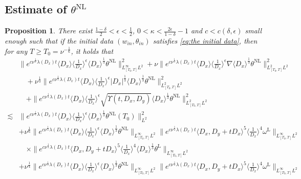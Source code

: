 \documentclass[reqno, 12pt]{amsart} %
\theoremstyle{plain} %
\newtheorem{Prop}[Thm]{Proposition}
\theoremstyle{definition}
\theoremstyle{remark}
\numberwithin{equation}{section} %
\begin{document}
	\subsection{Estimate of $\theta^{\mathrm{NL}}$}
	\begin{Prop} \label{lem:est of thetanl}
		There exist $\frac{1-\delta}{2}<\epsilon<\frac{1}{2}$, $0<\kappa<\frac{2\epsilon}{1-\delta}-1$ and $c<c(\delta,\epsilon)$ small enough such that if the initial data $(w_{in}, \theta_{in})$ satisfies \eqref{eq:the initial data}, then for any $  T \geq T_{0} = \nu^{-\frac{1}{6}} $, it holds that
		\footnotesize{\begin{align*} 
				& \| e^{c \nu^{\frac{1}{3}} \lambda\left(D_x\right) t}\langle D_x\rangle\langle\frac{1}{D_x}\rangle^\epsilon \langle D_x \rangle^\frac13  \theta^{\mathrm{NL}}\|_{L_{[T_0, T]}^\infty L^2}^2+\nu\|e^{c \nu^{\frac{1}{3}} \lambda\left(D_x\right) t}\langle D_x\rangle\langle\frac{1}{D_x}\rangle^\epsilon \nabla \langle D_x \rangle^\frac13  \theta^{\mathrm{NL}}\|_{L_{[T_0, T]}^2 L^2}^2 \\
				& \quad+ \nu^{\frac{1}{3}}\|e^{c \nu^{\frac{1}{3}} \lambda\left(D_x\right) t}\langle D_x\rangle\langle\frac{1}{D_x}\rangle^\epsilon\left|D_x\right|^{\frac{1}{3}}  \langle D_x \rangle ^\frac13 \theta^{\mathrm{NL}}\|_{L_{[T_0, T]}^2 L^2}^2  
				\\
				& \quad+\|e^{c \nu^{\frac{1}{3}} \lambda\left(D_x\right) t}\langle D_x\rangle\langle\frac{1}{D_x}\rangle^\epsilon \sqrt{\Upsilon\left(t, D_x, D_y\right)} \langle D_x \rangle^\frac13  \theta^{\mathrm{NL}}\|_{L_{[T_0, T]}^2 L^2}^2 \\
				\lesssim &  \| e^{c \nu^{\frac{1}{3}} \lambda\left(D_x\right) t}\langle D_x\rangle\langle\frac{1}{D_x}\rangle^\epsilon \langle D_x \rangle^\frac13  \theta^{\mathrm{NL}}(T_0)\|_{L^2}^2 \\	&  +\nu^\frac16 \|e^{c \nu^{\frac{1}{3}} \lambda\left(D_x\right) t}\langle D_x\rangle  \langle \frac{1}{D_x}\rangle^\epsilon \langle D_x \rangle^\frac13  \theta^{\mathrm{NL}}\|_{L_{[T_0, T]}^\infty L^2}    \|e^{c \nu^{\frac{1}{3}} \lambda\left(D_x\right) t}\langle D_x, D_y + tD_x\rangle^5\langle\frac{1}{D_x}\rangle^4 \omega^{\mathrm{L}} \|_{L_{[T_0, T]}^\infty L^2} \\
				&\quad \times  \|e^{c \nu^{\frac{1}{3}} \lambda\left(D_x\right) t}\langle D_x, D_y + tD_x\rangle^5\langle\frac{1}{D_x}\rangle^4 \langle D_x \rangle^\frac13  \theta^{\mathrm{L}} \|_{L_{[T_0, T]}^\infty L^2} \\
				&+ \nu^\frac14 \|e^{c \nu^{\frac{1}{3}} \lambda\left(D_x\right) t}\langle D_x\rangle  \langle \frac{1}{D_x}\rangle^\epsilon \langle D_x \rangle^\frac13  \theta^{\mathrm{NL}}\|_{L_{[T_0, T]}^\infty L^2}    \|e^{c \nu^{\frac{1}{3}} \lambda\left(D_x\right) t}\langle D_x, D_y + tD_x\rangle^5\langle\frac{1}{D_x}\rangle^4 \omega^{\mathrm{L}} \|_{L_{[T_0, T]}^\infty L^2} \\

\end{align*}}
\end{Prop}
\end{document}
